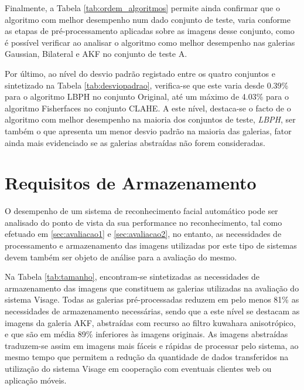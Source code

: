 Finalmente, a Tabela \ref{tab:ordem_algoritmos} permite ainda confirmar que o algoritmo com melhor desempenho num dado conjunto de teste, varia conforme as etapas de pré-processamento aplicadas sobre as imagens desse conjunto, como é possível verificar ao analisar o algoritmo como melhor desempenho nas galerias Gaussian, Bilateral e AKF no conjunto de teste A.

Por último, ao nível do desvio padrão registado entre os quatro conjuntos e sintetizado na Tabela \ref{tab:desviopadrao},  verifica-se que este varia desde 0.39\% para o algoritmo LBPH no conjunto Original, até um máximo de 4.03\%  para o algoritmo Fisherfaces no conjunto CLAHE. A este nível, destaca-se o facto de o algoritmo com melhor desempenho na maioria dos conjuntos de teste, \textit{LBPH}, ser também o que apresenta um menor desvio padrão na maioria das galerias, fator ainda mais evidenciado se as galerias abstraídas não forem consideradas.

\section{Requisitos de Armazenamento} \label{sec:armazenamento}
O desempenho de um sistema de reconhecimento facial automático pode ser analisado do ponto de vista da sua performance no reconhecimento, tal como efetuado em \ref{sec:avaliacao1} e \ref{sec:avaliacao2}, no entanto, as necessidades de processamento e armazenamento das imagens utilizadas por este tipo de sistemas devem também ser objeto de análise para a avaliação do mesmo. 

Na Tabela \ref{tab:tamanho}, encontram-se sintetizadas as necessidades de armazenamento das imagens que constituem as galerias utilizadas na avaliação do sistema Visage. Todas as galerias pré-processadas reduzem em pelo menos 81\% as necessidades de armazenamento necessárias, sendo que a este nível se destacam as imagens da galeria AKF, abstraídas com recurso ao filtro kuwahara anisotrópico, e que são em média 89\% inferiores às imagens originais. As imagens abstraídas traduzem-se assim em imagens mais fáceis e rápidas de processar pelo sistema, ao mesmo tempo que permitem a redução da quantidade de dados transferidos na utilização do sistema Visage em cooperação com eventuais clientes web ou aplicação móveis.

